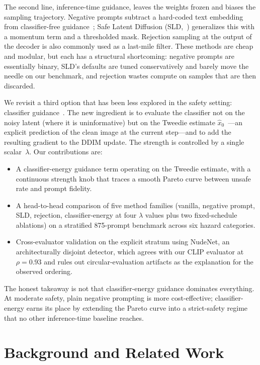 \documentclass{article}
\begin{document}
The second line, inference-time guidance, leaves the weights frozen and biases the sampling trajectory. Negative prompts subtract a hard-coded text embedding from classifier-free guidance~\citep{ho2022cfg}; Safe Latent Diffusion (SLD,~\citealp{schramowski2023sld}) generalizes this with a momentum term and a thresholded mask. Rejection sampling at the output of the decoder is also commonly used as a last-mile filter. These methods are cheap and modular, but each has a structural shortcoming: negative prompts are essentially binary, SLD's defaults are tuned conservatively and barely move the needle on our benchmark, and rejection wastes compute on samples that are then discarded.

We revisit a third option that has been less explored in the safety setting: classifier guidance~\citep{dhariwal2021diffusion}. The new ingredient is to evaluate the classifier not on the noisy latent (where it is uninformative) but on the Tweedie estimate $\hat{x}_0$~\citep{efron2011tweedie,bansal2023universal}---an explicit prediction of the clean image at the current step---and to add the resulting gradient to the DDIM update. The strength is controlled by a single scalar~$\lambda$. Our contributions are:

\begin{itemize}
\item A classifier-energy guidance term operating on the Tweedie estimate, with a continuous strength knob that traces a smooth Pareto curve between unsafe rate and prompt fidelity.
\item A head-to-head comparison of five method families (vanilla, negative prompt, SLD, rejection, classifier-energy at four $\lambda$ values plus two fixed-schedule ablations) on a stratified 875-prompt benchmark across six hazard categories.
\item Cross-evaluator validation on the explicit stratum using NudeNet, an architecturally disjoint detector, which agrees with our CLIP evaluator at $\rho=0.93$ and rules out circular-evaluation artifacts as the explanation for the observed ordering.
\end{itemize}

The honest takeaway is not that classifier-energy guidance dominates everything. At moderate safety, plain negative prompting is more cost-effective; classifier-energy earns its place by extending the Pareto curve into a strict-safety regime that no other inference-time baseline reaches.

\section{Background and Related Work}
\label{sec:background}
\end{document}
